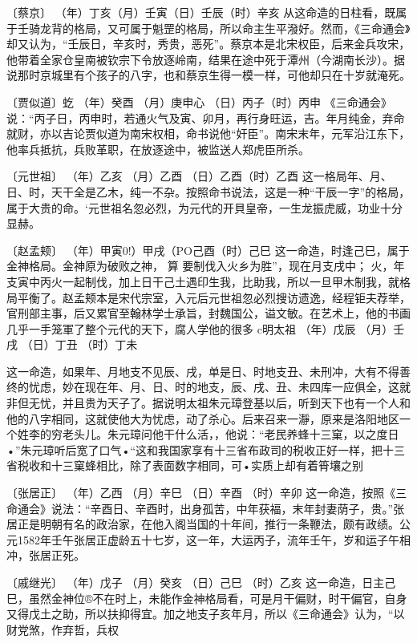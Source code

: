 \documentclass[a5paper,oneside,12pt]{ctexbook}
\begin{document}
{{〔蔡京〕
（年）丁亥（月）壬寅（日）壬辰（时）辛亥
从这命造的日柱看，既属于壬骑龙背的格局，又可属于魁罡的格局，所以命主生平潑好。然而，《三命通会》却又认为，“壬辰日，辛亥时，秀贵，恶死”。蔡京本是北宋权臣，后来金兵攻宋，他带着全家仓皇南被钦宗下令放逐岭南，结果在途中死于潭州（今湖南长沙）。据说那时京城里有个孩子的八字，也和蔡京生得一模一样，可他却只在十岁就淹死。

〔贾似道〕虼
（年）癸酉
（月）庚申心
（日）丙子（时）丙申
《三命通会》说：“丙子日，丙申时，若通火气及寅、卯月，再行身旺运，吉。年月纯金，弃命就财，亦以吉论贾似道为南宋权相，命书说他“奸臣”。南宋末年，元军沿江东下，他率兵抵抗，兵败革职，在放逐途中，被监送人郑虎臣所杀。

〔元世祖〕
（年）乙亥
（月）乙酉	
（日）乙酉（时）乙酉
这一格局年、月、日、时，天干全是乙木，纯一不杂。按照命书说法，这是一种“干辰一字”的格局，属于大贵的命。‘元世祖名忽必烈，为元代的开貝皇帝，一生龙振虎威，功业十分显赫。

〔赵孟颊〕
（年）甲寅0!）甲戌（PO己酉（时）己巳
这一命造，时逢己巳，属于金神格局。金神原为破败之神，
算
要制伐入火乡为胜”，现在月支戌中； 火，年支寅中丙火一起制伐，加上日干己土遇印生我，比助我，所以一旦甲木制我，就格局平衡了。赵孟颊本是宋代宗室，入元后元世祖忽必烈搜访遗逸，经程钜夫荐举，官刑部主事，后又累官至翰林学士承旨，封魏国公，谥文敏。在艺术上，他的书画几乎一手笼軍了整个元代的天下，腐人学他的很多
c明太祖
（年）戊辰
（月）壬戌
（日）丁丑
（时）丁未

这一命造，如果年、月地支不见辰、戌，单是日、时地支丑、未刑冲，大有不得善终的忧虑，妙在现在年、月、日、时的地支，辰、戌、丑、未四库一应俱全，这就非但无忧，并且贵为天子了。据说明太祖朱元璋登基以后，听到天下也有一个人和他的八字相同，这就使他大为忧虑，动了杀心。后来召来一瀞，原来是洛阳地区一个姓李的穷老头儿。朱元璋问他干什么活，，他说：“老民养蜂十三窠，以之度日•”朱元璋听后宽了口气•“这和我国家享有十三省布政司的税收正好一样，把十三省税收和十三窠蜂相比，除了表面数字相同，可•实质上却有着筲壤之别

〔张居正〕
（年）乙西
（月）辛巳
（日）辛酉
（时）辛卯
这一命造，按照《三命通会》说法：“辛酉日、辛酉时，出身孤苦，中年获福，末年封妻荫子，贵。”张居正是明朝有名的政治家，在他入阁当国的十年间，推行一条鞭法，颇有政绩。公元1582年壬午张居正虚龄五十七岁，这一年，大运丙子，流年壬午，岁和运子午相冲，张居正死。

〔戚继光〕
（年）戊子
（月）癸亥
（日）己巳
（时）乙亥
这一命造，日主己巳，虽然金神位®不在时上，未能作金神格局看，可是月干偏财，时干偏官，自身又得戊土之助，所以扶抑得宜。加之地支子亥年月，所以《三命通会》认为，“以财党煞，作弃哲，兵权

}}
\end{document}
